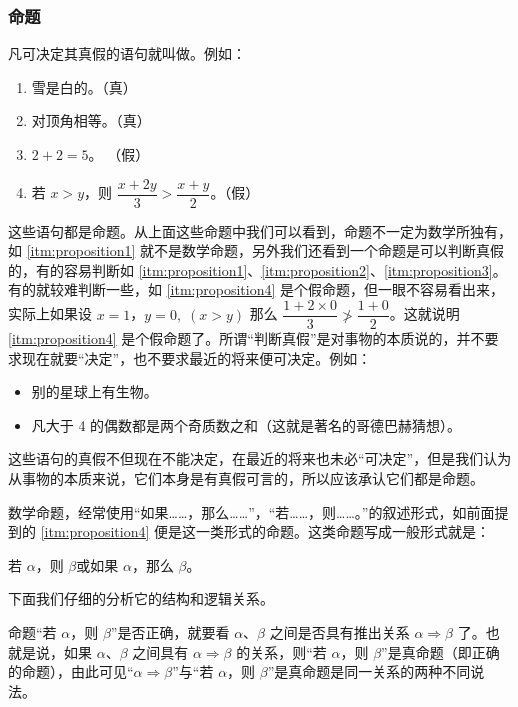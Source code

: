 \subsubsection{命题}
凡可决定其真假的语句就叫做。例如：
\begin{enumerate}
	\item\label{itm:proposition1} 雪是白的。（真）
	\item\label{itm:proposition2} 对顶角相等。（真）
	\item\label{itm:proposition3} $2+2=5$。 （假）
	\item\label{itm:proposition4} 若 $x>y$，则 $\dfrac{x+2y}{3}>\dfrac{x+y}{2}$。（假）
\end{enumerate}

这些语句都是命题。从上面这些命题中我们可以看到，命题不一定为数学所独有，如 \ref{itm:proposition1} 就不是数学命题，另外我们还看到一个命题是可以判断真假的，有的容易判断如 \ref{itm:proposition1}、\ref{itm:proposition2}、\ref{itm:proposition3}。有的就较难判断一些，如 \ref{itm:proposition4} 是个假命题，但一眼不容易看出来，实际上如果设 $x=1$，$y=0,\;(x>y)$ 那么 $\dfrac{1+2\times 0}{3}\not>\dfrac{1+0}{2}$。这就说明 \ref{itm:proposition4} 是个假命题了。所谓“判断真假”是对事物的本质说的，并不要求现在就要“决定”，也不要求最近的将来便可决定。例如：
\begin{itemize}
	\item 别的星球上有生物。
	\item 凡大于 4 的偶数都是两个奇质数之和（这就是著名的哥德巴赫猜想）。
\end{itemize}

这些语句的真假不但现在不能决定，在最近的将来也未必“可决定”，但是我们认为从事物的本质来说，它们本身是有真假可言的，所以应该承认它们都是命题。

数学命题，经常使用“如果……，那么……”，“若……，则……。”的叙述形式，如前面提到的 \ref{itm:proposition4} 便是这一类形式的命题。这类命题写成一般形式就是：
\begin{blk}{}
	若 $\alpha$，则 $\beta$\qquad 或\qquad  如果 $\alpha$，那么 $\beta$。
\end{blk}

下面我们仔细的分析它的结构和逻辑关系。

命题“若 $\alpha$，则 $\beta$”是否正确，就要看 $\alpha$、$\beta$ 之间是否具有推出关系 $\alpha\Rightarrow\beta$ 了。也就是说，如果 $\alpha$、$\beta$ 之间具有 $\alpha\Rightarrow\beta$ 的关系，则“若 $\alpha$，则 $\beta$”是真命题（即正确的命题），由此可见“$\alpha\Rightarrow\beta$”与“若 $\alpha$，则 $\beta$”是真命题是同一关系的两种不同说法。

